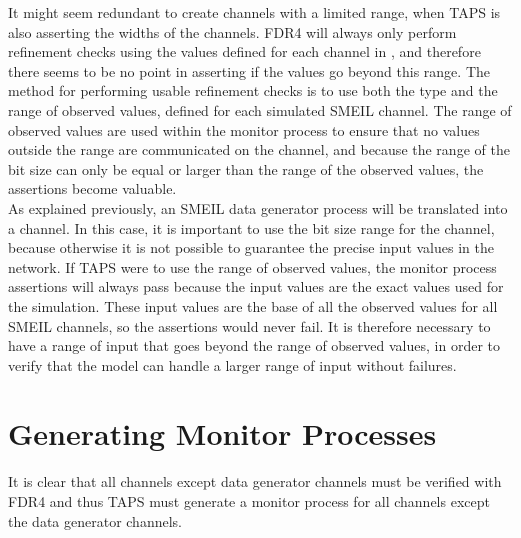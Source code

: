 It might seem redundant to create \cspm{} channels with a limited range, when TAPS is also asserting the widths of the channels. FDR4 will always only perform refinement checks using the values defined for each channel in \cspm{}, and therefore there seems to be no point in asserting if the values go beyond this range. The method for performing usable refinement checks is to use both the type and the range of observed values, defined for each simulated SMEIL channel. The range of observed values are used within the monitor process to ensure that no values outside the range are communicated on the channel, and because the range of the bit size can only be equal or larger than the range of the observed values, the assertions become valuable. \\

As explained previously, an SMEIL data generator process will be translated into a \cspm{} channel. In this case, it is important to use the bit size range for the \cspm{} channel, because otherwise it is not possible to guarantee the precise input values in the network. If TAPS were to use the range of observed values, the monitor process assertions will always pass because the input values are the exact values used for the simulation. These input values are the base of all the observed values for all SMEIL channels, so the assertions would never fail. It is therefore necessary to have a range of input that goes beyond the range of observed values, in order to verify that the model can handle a larger range of input without failures.
\section{Generating Monitor Processes}
It is clear that all channels except data generator channels must be verified with FDR4 and thus TAPS must generate a monitor process for all channels except the data generator channels.\\


